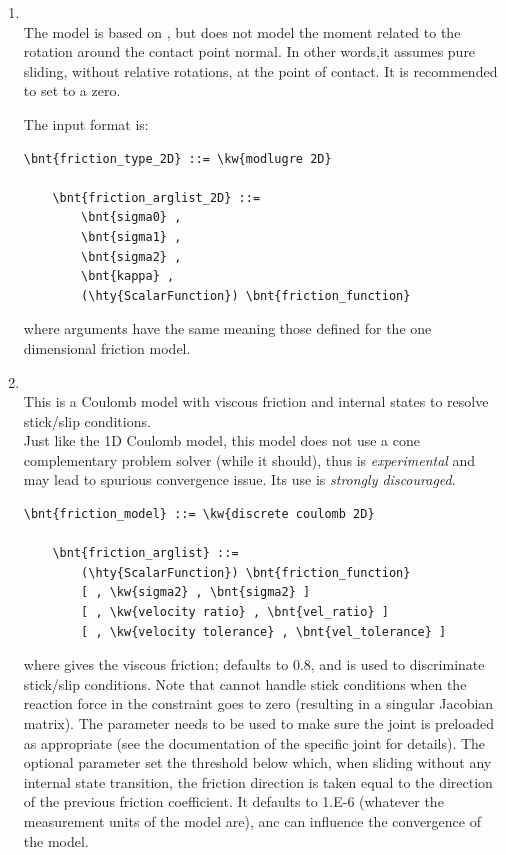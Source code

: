 \begin{enumerate}
    \item {}\\

    The  model is based on \cite{Waltersson_Karayiannidis_2024}, but
    does not model the moment related to the rotation around the contact point normal.
    In other words,it assumes pure sliding, without relative rotations, at the point of contact.
    It is recommended to set  to a zero.

    The input format is:
\begin{Verbatim}[commandchars=\\\{\}]
    \bnt{friction_type_2D} ::= \kw{modlugre 2D}

    \bnt{friction_arglist_2D} ::=
        \bnt{sigma0} ,
        \bnt{sigma1} ,
        \bnt{sigma2} ,
        \bnt{kappa} ,
        (\hty{ScalarFunction}) \bnt{friction_function}
\end{Verbatim}
where arguments have the same meaning those defined for the  one dimensional friction model.

    \item {}\\
    This is a Coulomb model with viscous friction and
    internal states to resolve stick/slip conditions.\\
    Just like the 1D Coulomb model, this model does not use a cone complementary problem solver (while it should),
    thus is \emph{experimental} and may lead to spurious convergence issue. Its use is \emph{strongly discouraged}.
\begin{Verbatim}[commandchars=\\\{\}]
    \bnt{friction_model} ::= \kw{discrete coulomb 2D}

    \bnt{friction_arglist} ::=
        (\hty{ScalarFunction}) \bnt{friction_function}
        [ , \kw{sigma2} , \bnt{sigma2} ]
        [ , \kw{velocity ratio} , \bnt{vel_ratio} ]
        [ , \kw{velocity tolerance} , \bnt{vel_tolerance} ]
\end{Verbatim}
    where  gives the viscous friction;
     defaults to 0.8, and is used
    to discriminate stick/slip conditions.
    Note that 
    cannot handle stick conditions when the reaction force
    in the constraint goes to zero (resulting in a singular Jacobian matrix).
    The  parameter needs to be used to make sure
    the joint is preloaded as appropriate
    (see the documentation of the specific joint for details).
    The optional parameter  set the threshold below which, when sliding without any internal state transition, the friction direction is taken
    equal to the direction of the previous friction coefficient. It defaults to 1.E-6 
    (whatever the measurement units of the model are), anc can influence the convergence of the model.
\end{enumerate}

